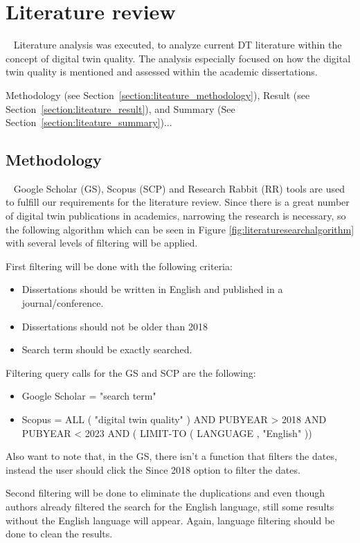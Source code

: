 \documentclass[9pt,conference]{IEEEtran}
\begin{document}
    \section{Literature review}~\label{section: literature}
    Literature analysis was executed, to analyze current DT literature within the concept of digital twin quality. The analysis especially focused on 
    how the digital twin quality is mentioned and assessed within the academic dissertations.

    Methodology (see Section~\ref{section:liteature_methodology}), Result (see Section~\ref{section:liteature_result}), and Summary (See Section~\ref{section:liteature_summary})...
    \subsection{Methodology}~\label{section:liteature_methodology}
    Google Scholar (GS), Scopus (SCP) and Research Rabbit (RR) tools are used to fulfill our requirements for the literature review. 
    Since there is a great number of digital twin publications in academics, 
    narrowing the research is necessary, so the following algorithm which can be seen in Figure \ref{fig:literaturesearchalgorithm} with several levels of filtering will be applied.
    
    First filtering will be done with the following criteria:
    \begin{itemize}
        \item Dissertations should be written in English and published in a journal/conference.
        \item Dissertations should not be older than 2018
        \item Search term should be exactly searched.
    \end{itemize}

    Filtering query calls for the GS and SCP are the following:
    \begin{itemize}
        \item Google Scholar = "search term"
        \item Scopus = ALL ( "digital twin quality" ) AND PUBYEAR > 2018 AND PUBYEAR < 2023 AND ( LIMIT-TO ( LANGUAGE , "English" )) 
    \end{itemize} 

    Also want to note that, in the GS, there isn't a function that filters the dates, instead the user should click the Since 2018 option to filter the dates.


    Second filtering will be done to eliminate the duplications and even though authors already filtered the search for the English language,
    still some results without the English language will appear. Again, language filtering should be done to clean the results.
    
\end{document}
